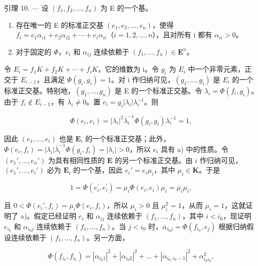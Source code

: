 引理 10. --- 设 \((f_1, f_2, \ldots, f_n)\) 为 E 的一个基。

\begin{enumerate}
\def\labelenumi{\alph{enumi})}
\item
  存在唯一的 E 的标准正交基 \((e_{1}, e_{2}, \ldots, e_{n})\)，使得 \(f_{i} = e_{1}\alpha_{i1} + e_{2}\alpha_{i2} + \cdots + e_{i}\alpha_{ii}\)（\(i = 1, 2, \ldots, n\)），且对所有 i 都有 \(\alpha_{ii} > 0\)。
\item
  对于固定的 \(\Phi\)，\(e_i\) 和 \(\alpha_{ij}\) 连续依赖于 \((f_1, \ldots, f_n) \in \mathbf{E}^n\)。
\end{enumerate}

令 \(E_{i}=f_{1}K+f_{2}K+\cdots+f_{i}K\)，它的维数为 i。令 \(g_{i}\) 为 \(E_{i}\) 中一个非零元素，正交于 \(E_{i-1}\)，且满足 \(\Phi(g_{i},g_{i})=1\)。对 i 作归纳可见，\((g_{1},\ldots,g_{i})\) 是 \(E_{i}\) 的一个标准正交基。特别地，\((g_{1},\ldots,g_{n})\) 是 E 的一个标准正交基。令 \(\lambda_{i}=\Phi(f_{i},g_{i})\)。由于 \(f_{i}\notin E_{i-1}\)，有 \(\lambda_{i}\neq0\)。置 \(e_{i}=g_{i}\left|\lambda_{i}\right|\lambda_{i}^{-1}\)。则

\[
\Phi (e _ {i}, e _ {i}) = | \lambda_ {i} | ^ {2} \overline {{{{\lambda}}}} _ {i} ^ {- 1} \Phi (g _ {i}, g _ {i}) \lambda_ {i} ^ {- 1} = 1,
\]

因此 \((e_1, \ldots, e_i)\) 也是 \(\mathbf{E}_i\) 的一个标准正交基；此外，\(\Phi(e_i, f_i) = |\lambda_i| \overline{\lambda}_i^{-1} \Phi(g_i, f_i) = |\lambda_i| > 0\)，所以 \(e_i\) 具有 a) 中的性质。令 \((e_1', \ldots, e_n')\) 为具有相同性质的 \(\mathbf{E}\) 的另一个标准正交基。由 \(i\) 作归纳可见，\((e_1', \ldots, e_i')\) 必为 \(\mathbf{E}_i\) 的一个基，因此 \(e_i' = e_i \mu_i\)，其中 \(\mu_i \in \mathbf{K}\)。于是

\[
1 = \Phi (e _ {i} ^ {\prime}, e _ {i} ^ {\prime}) = \overline {{\mu}} _ {i} \Phi (e _ {i}, e _ {i}) \mu_ {i} = \overline {{\mu}} _ {i} \mu_ {i},
\]

且 \(0 < \Phi(e_i', f_i) = \overline{\mu}_i \Phi(e_i, f_i)\)，所以 \(\mu_i > 0\) 且 \(\mu_i^2 = 1\)，从而 \(\mu_i = 1\)，这就证明了 a)。假定已经证明 \(e_i\) 和 \(\alpha_{ij}\) 连续依赖于 \((f_1, \ldots, f_n)\)，其中 \(i < i_0\)，现证明 \(e_{i_0}\) 和 \(\alpha_{i_0j}\) 连续依赖于 \((f_1, \ldots, f_n)\)。当 \(j < i_0\) 时，\(\overline{\alpha}_{i_0j} = \Phi(f_{i_0}, e_j)\) 根据归纳假设连续依赖于 \((f_1, \ldots, f_n)\)。另一方面，

\[
\Phi (f _ {i _ {0}}, f _ {i _ {0}}) = | \alpha_ {i _ {0} 1} | ^ {2} + | \alpha_ {i _ {0} 2} | ^ {2} + \dots + | \alpha_ {i _ {0}, i _ {0} - 1} | ^ {2} + \alpha_ {i _ {0} i _ {0}} ^ {2},
\]

